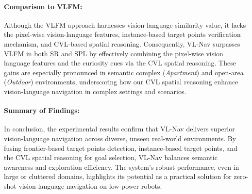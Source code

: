 \paragraph{Comparison to VLFM:}
Although the VLFM approach \cite{yokoyama2024vlfm} harnesses vision-language similarity value, it lacks the pixel-wise vision-language features, instance-based target points verification mechanism, and CVL-based spatial reasoning. Consequently, VL-Nav surpasses VLFM in both SR and SPL by effectively combining the pixel-wise vision language features and the curiosity cues via the CVL spatial reasoning. These gains are especially pronounced in semantic complex (\textit{Apartment}) and open-area (\textit{Outdoor}) environments, underscoring how our CVL spatial reasoning enhance vision-language navigation in complex settings and scenarios.



\paragraph{Summary of Findings:}
In conclusion, the experimental results confirm that VL-Nav delivers superior vision-language navigation across diverse, unseen real-world environments. By fusing frontier-based target points detection, instance-based target points, and the CVL spatial reasoning for goal selection, VL-Nav balances semantic awareness and exploration efficiency. The system’s robust performance, even in large or cluttered domains, highlights its potential as a practical solution for zero-shot vision-language navigation on low-power robots.
